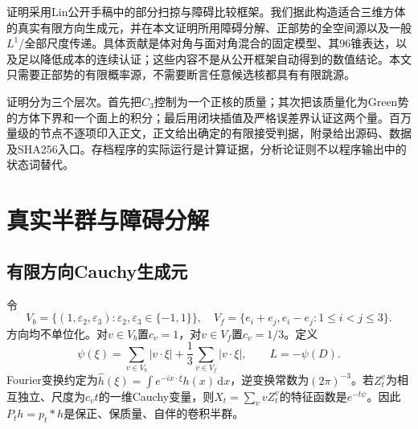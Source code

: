 \documentclass[UTF8,11pt,a4paper,fontset=fandol]{ctexart}
\theoremstyle{definition}\newtheorem{definition}[theorem]{定义}
\theoremstyle{remark}\newtheorem{remark}[theorem]{注}
\newcommand{\dd}{\,\mathrm d}
\newcommand{\abs}[1]{\left|#1\right|}
\begin{document}
证明采用Lin公开手稿中的部分扫掠与障碍比较框架\cite{Lin}。我们据此构造适合三维方体的真实有限方向生成元，并在本文证明所用障碍分解、正部势的全空间源以及一般$L^1$/全部尺度传递。具体贡献是体对角与面对角混合的固定模型、其96锥表达，以及足以降低成本的连续认证；这些内容不是从公开框架自动得到的数值结论。本文只需要正部势的有限概率源，不需要断言任意候选核都具有有限跳源。

证明分为三个层次。首先把$C_3$控制为一个正核的质量；其次把该质量化为Green势的方体下界和一个面上的积分；最后用闭块插值及严格误差界认证这两个量。百万量级的节点不逐项印入正文，正文给出确定的有限接受判据，附录给出源码、数据及SHA256入口。存档程序的实际运行是计算证据，分析论证则不以程序输出中的状态词替代。

\section{真实半群与障碍分解}
\subsection{有限方向Cauchy生成元}
令
\[
 V_b=\{(1,\varepsilon_2,\varepsilon_3):\varepsilon_2,\varepsilon_3\in\{-1,1\}\},
 \quad V_f=\{e_i+e_j,e_i-e_j:1\le i<j\le3\}.
\]
方向均不单位化。对$v\in V_b$置$c_v=1$，对$v\in V_f$置$c_v=1/3$。定义
\begin{equation}\label{eq:symbol}
 \psi(\xi)=\sum_{v\in V_b}\abs{v\cdot\xi}
       +\frac13\sum_{v\in V_f}\abs{v\cdot\xi},\qquad L=-\psi(D).
\end{equation}
Fourier变换约定为$\widehat h(\xi)=\int e^{-ix\cdot\xi}h(x)\dd x$，逆变换常数为$(2\pi)^{-3}$。若$Z^v_t$为相互独立、尺度为$c_vt$的一维Cauchy变量，则$X_t=\sum_vvZ^v_t$的特征函数是$e^{-t\psi}$。因此$P_th=p_t*h$是保正、保质量、自伴的卷积半群。
\end{document}
